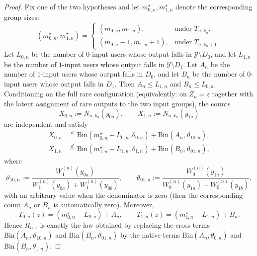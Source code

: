 \documentclass[10pt,a4paper]{amsart}
\begin{document}
\begin{proof}
Fix one of the two hypotheses and let $m_{0,n}^\star,m_{1,n}^\star$ denote the corresponding group sizes:
\[
(m_{0,n}^\star,m_{1,n}^\star)=
\begin{cases}
(m_{0,n},m_{1,n}), & \text{under }T_{n,k_n},\\
(m_{0,n}-1,m_{1,n}+1), & \text{under }T_{n,k_n+1}.
\end{cases}
\]
Let $L_{0,n}$ be the number of $0$-input users whose output falls in $\mathcal Y\setminus D_0$, and let $L_{1,n}$ be the number of $1$-input users whose output falls in $\mathcal Y\setminus D_1$. Let $A_n$ be the number of $1$-input users whose output falls in $D_0$, and let $B_n$ be the number of $0$-input users whose output falls in $D_1$. Then $A_n\le L_{1,n}$ and $B_n\le L_{0,n}$. Conditioning on the full rare configuration (equivalently: on $Z_n=z$ together with the latent assignment of rare outputs to the two input groups), the counts
\[
X_{0,n}:=N_{n,k_n}(y_{0a}),
\qquad
X_{1,n}:=N_{n,k_n}(y_{1a})
\]
are independent and satisfy
\begin{align*}
X_{0,n}
&\overset d= \mathrm{Bin}(m_{0,n}^\star-L_{0,n},\theta_{0,n})+\mathrm{Bin}(A_n,\vartheta_{10,n}),\\
X_{1,n}
&\overset d= \mathrm{Bin}(m_{1,n}^\star-L_{1,n},\theta_{1,n})+\mathrm{Bin}(B_n,\vartheta_{01,n}),
\end{align*}
where
\[
\vartheta_{10,n}:=\frac{W_1^{(n)}(y_{0a})}{W_1^{(n)}(y_{0a})+W_1^{(n)}(y_{0b})},
\qquad
\vartheta_{01,n}:=\frac{W_0^{(n)}(y_{1a})}{W_0^{(n)}(y_{1a})+W_0^{(n)}(y_{1b})},
\]
with an arbitrary value when the denominator is zero (then the corresponding count $A_n$ or $B_n$ is automatically zero). Moreover,
\[
T_{0,n}(z)=(m_{0,n}^\star-L_{0,n})+A_n,
\qquad
T_{1,n}(z)=(m_{1,n}^\star-L_{1,n})+B_n.
\]
Hence $R_{n,z}$ is exactly the law obtained by replacing the cross terms $\mathrm{Bin}(A_n,\vartheta_{10,n})$ and $\mathrm{Bin}(B_n,\vartheta_{01,n})$ by the native terms $\mathrm{Bin}(A_n,\theta_{0,n})$ and $\mathrm{Bin}(B_n,\theta_{1,n})$.


\end{proof}
\end{document}
